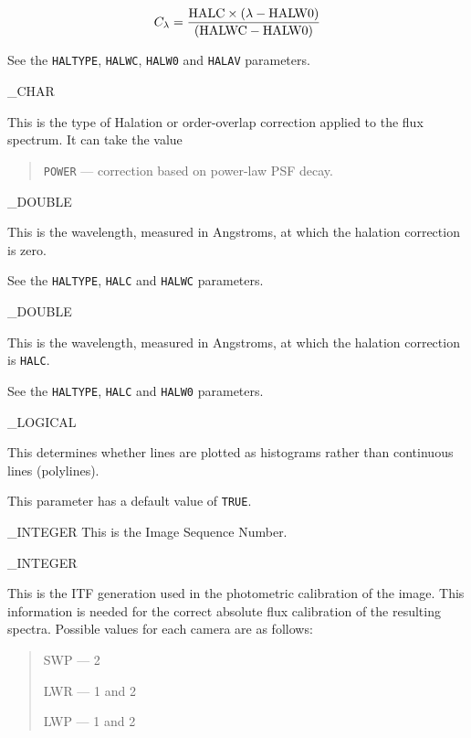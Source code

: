 {{   \begin {equation}
      C_\lambda = \frac{{\rm HALC} \times (\lambda - {\rm HALW0})}
                       {({\rm HALWC} - {\rm HALW0})}
   \end {equation}

   See the \verb+HALTYPE+, \verb+HALWC+, \verb+HALW0+ and \verb+HALAV+
   parameters.
}

{
   \_CHAR
}{
   This is the type of Halation or order-overlap correction applied to the
   flux spectrum.
   It can take the value

   \begin {quote}
   \begin {description}
      \item {\tt POWER} --- correction based on power-law PSF decay.
   \end {description}
   \end {quote}
}

{
   \_DOUBLE
}{
   This is the wavelength, measured in Angstroms, at which the
   halation correction is zero.

   See the \verb+HALTYPE+, \verb+HALC+ and \verb+HALWC+ parameters.
}

{
   \_DOUBLE
}{
   This is the wavelength, measured in Angstroms, at which the
   halation correction is \verb+HALC+\@.

   See the \verb+HALTYPE+, \verb+HALC+ and \verb+HALW0+ parameters.
}

{
   \_LOGICAL
}{
   This determines whether lines are plotted as histograms rather than
   continuous lines (polylines).

   This parameter has a default value of \verb+TRUE+\@.
}

{
   \_INTEGER
}{
   This is the Image Sequence Number.
}

{
   \_INTEGER
}{
   This is the ITF generation used in the photometric calibration of the
   image.  This information is needed for the correct absolute flux
   calibration of the resulting spectra.  Possible values for each camera
   are as follows:

   \begin {quote}
   \begin {description}
      \item SWP --- 2
      \item LWR --- 1 and 2
      \item LWP --- 1 and 2
   \end {description}
   \end {quote}

}}
